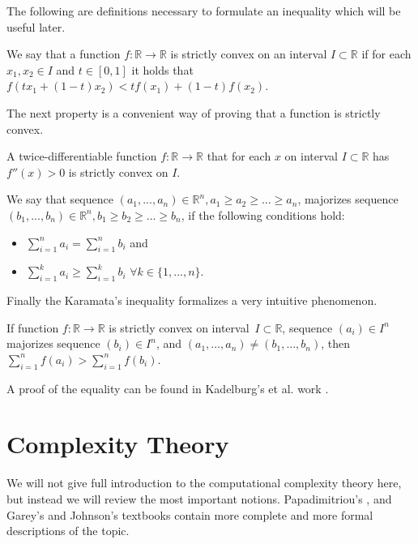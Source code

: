 The following are definitions necessary to formulate an inequality which will be useful later.

\begin{defn}
We say that a function $f:\mathbb{R}\rightarrow\mathbb{R}$ is strictly convex on an interval $I \subset \mathbb{R}$
if for each $x_1, x_2 \in I$ and $t \in [0,1]$ it holds that $f(t x_1 + (1-t) x_2) < tf(x_1) + (1-t)f(x_2)$.
\end{defn}

The next property is a convenient way of proving that a function is strictly convex.

\begin{prp}
A twice-differentiable function $f:\mathbb{R}\rightarrow\mathbb{R}$
that for each $x$ on interval $I \subset \mathbb{R}$ has $f''(x) > 0$
is strictly convex on $I$.
\end{prp}

\begin{defn}[majorization]
We say that sequence $(a_1, ..., a_n) \in \mathbb{R}^n, a_1 \geq a_2 \geq ... \geq a_n$,
majorizes sequence $(b_1, ..., b_n) \in \mathbb{R}^n, b_1 \geq b_2 \geq ... \geq b_n$,
if the following conditions hold:
\begin{itemize}
	\item $\sum_{i=1}^n a_i = \sum_{i=1}^n b_i$ and
	\item $\sum_{i=1}^k a_i \geq \sum_{i=1}^k b_i$ $\forall k \in \{ 1, ..., n\}$.
\end{itemize}
\end{defn}

Finally the Karamata's inequality formalizes a very intuitive phenomenon.

\begin{thm} \label{thm:Kar}
If function $f:\mathbb{R}\rightarrow\mathbb{R}$ is strictly convex on interval~$I \subset \mathbb{R}$,
sequence $(a_i) \in I^n$ majorizes sequence $(b_i) \in I^n$,
and $(a_1, ..., a_n) \neq (b_1, ..., b_n)$, then
$\sum_{i=1}^n f(a_i) > \sum_{i=1}^n f(b_i)$.
\end{thm}

A proof of the equality can be found in Kadelburg's et al. work \cite{karamata}.

\section{Complexity Theory}

We will not give full introduction to the computational complexity theory here,
but instead we will review the most important notions.
Papadimitriou's \cite{compcomplexity}, and Garey's and Johnson's \cite{computersandintractability} textbooks
contain more complete and more formal descriptions of the topic.

